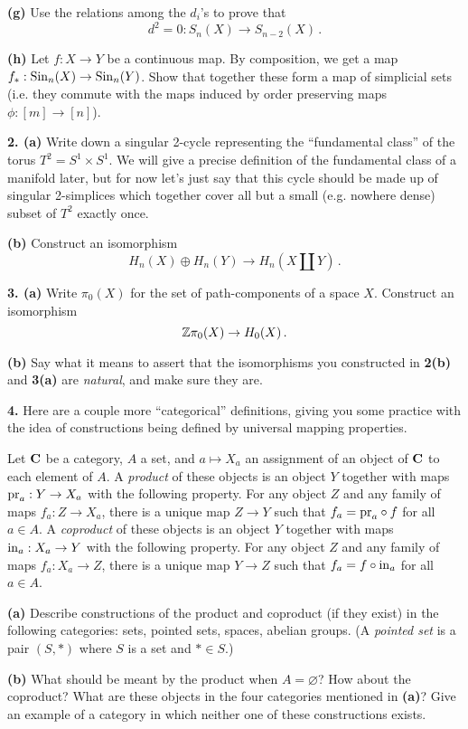 \documentclass[12pt]{article}
\begin{document}
{\bf (g)} Use the relations among the $d_i$'s to prove that 
\[
d^2=0:S_n(X)\to S_{n-2}(X)\,.
\]

{\bf (h)} Let $f:X\to Y$ be a continuous map. By composition, we get a 
map $f_*:\mathrm{Sin}_n(X)\to\mathrm{Sin}_n(Y)$. Show that together these form a map of
simplicial sets (i.e. they commute with the maps induced by order preserving
maps $\phi:[m]\to[n]$).


\medskip
{\bf2. (a)} 
Write down a singular 2-cycle representing the ``fundamental class''
of the torus $T^2=S^1\times S^1$. We will give a precise definition of
the fundamental class of a manifold later, but for now let's just say that 
this cycle should be made up of singular 
2-simplices which together cover all but a small (e.g. nowhere dense) subset 
of $T^2$ exactly once. 

{\bf(b)} Construct an isomorphism
\[
H_n(X)\oplus H_n(Y)\to H_n(X\amalg Y)\,.
\]

\medskip
{\bf 3. (a)} Write $\pi_0(X)$ for the set of path-components of a space $X$.
Construct an isomorphism
\[
\mathbb Z\pi_0(X)\to H_0(X)\,.
\]

{\bf(b)} Say what it means to assert that the isomorphisms 
you constructed in {\bf 2(b)} and {\bf 3(a)} are {\em natural},
and make sure they are.

\medskip
{\bf 4.} Here are a couple more ``categorical'' definitions, giving you some
practice with the idea of constructions being defined by universal mapping
properties.  

Let $\mathbf{C}$ be
a category, $A$ a set, and $a\mapsto X_a$ an assignment of an object of $\mathbf{C}$
to each element of $A$. 
A {\em product} of these objects is an object $Y$ together with maps
$\mathrm{pr}_a:Y\to X_a$ with the following property. For any object $Z$ and 
any family of maps $f_a:Z\to X_a$, there is a unique map $Z\to Y$ such that
$f_a=\mathrm{pr}_a\circ f$ for all $a\in A$. 
A {\em coproduct} of these objects is an object $Y$ together with maps
$\mathrm{in}_a:X_a\to Y$ with the following property. For any object $Z$ and 
any family of maps $f_a:X_a\to Z$, there is a unique map $Y\to Z$ such that
$f_a=f\circ \mathrm{in}_a$ for all $a\in A$. 

{\bf (a)} Describe constructions of the product and coproduct (if they exist) 
in the following categories:
sets, pointed sets, spaces, abelian groups. 
(A {\em pointed set} is a pair $(S,*)$ where $S$ is a set and $*\in S$.)

{\bf (b)} What should be meant by the product when $A=\varnothing$? How about
the coproduct? What are these objects in the four categories mentioned in
{\bf(a)}? Give an example of a category in which neither one of these
constructions exists. 
\end{document}
